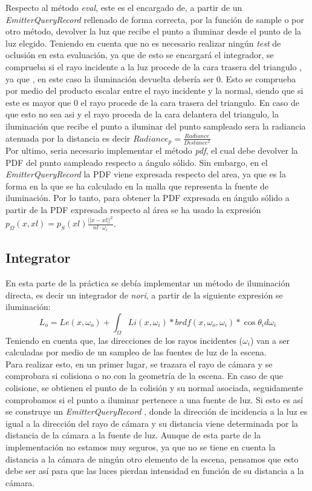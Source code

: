 \documentclass[10pt,oneside,a4paper]{article}
\begin{document}
Respecto al método \textit{eval}, este es el encargado de, a partir de un \textit{EmitterQueryRecord} rellenado de forma correcta, por la función de sample o por otro método, devolver la luz que recibe el punto a iluminar desde el punto de la luz elegido. Teniendo en cuenta que no es necesario realizar ningún \textit{test} de oclusión en esta evaluación, ya que de esto se encargará el integrador, se comprueba si el rayo incidente a la luz procede de la cara trasera del triangulo , ya que , en este caso la iluminación devuelta debería ser 0. Esto se comprueba por medio del producto escalar entre el rayo incidente y la normal, siendo que si este es mayor que 0 el rayo procede de la cara trasera del triangulo. En caso de que esto no sea asi y el rayo proceda de la cara delantera del triangulo, la iluminación que recibe el punto a iluminar del punto sampleado sera la radiancia atenuada por la distancia es decir $Radiance_p = \frac{Radiance}{Distance^2}$\\

Por ultimo, seria necesario implementar el método \textit{pdf}, el cual debe devolver la PDF del punto sampleado respecto a ángulo sólido. Sin embargo, en el  \textit{EmitterQueryRecord} la PDF viene expresada respecto del area, ya que es la forma en la que se ha calculado en la malla que representa la fuente de iluminación. Por lo tanto, para obtener la PDF expresada en ángulo sólido a partir de la PDF expresada respecto al área se ha usado la expresión $p_\Omega(x,xl) = p_S(xl)\frac{||x-xl||^2}{nl\cdot\omega_i}$.\\

\subsection{Integrator}
En esta parte de la práctica se debía implementar un método de iluminación directa, es decir un integrador de \textit{nori}, a partir de la siguiente expresión se iluminación:
$$L_o = Le(x,\omega_o) + \int_\Omega Li(x,\omega_i) * brdf(x,\omega_o,\omega_i)  * \cos\theta_i d\omega_i$$
Teniendo en cuenta que, las direcciones de los rayos incidentes ($\omega_i$) van a ser calculadas por medio de un sampleo de las fuentes de luz de la escena.\\

Para realizar esto, en un primer lugar, se trazara el rayo de cámara y se comprobara si colisiona o no con la geometría de la escena. En caso de que colisione, se obtienen el punto de la colisión y su normal asociada, seguidamente comprobamos si el punto a iluminar pertenece a una fuente de luz. Si esto es así se construye un \textit{EmitterQueryRecord} , donde la dirección de incidencia a la luz es igual a la dirección del rayo de cámara y su distancia viene determinada por la distancia de la cámara a la fuente de luz. Aunque de esta parte de la implementación no estamos muy seguros, ya que no se tiene en cuenta la distancia a la cámara de ningún otro elemento de la escena, pensamos que esto debe ser así para que las luces pierdan intensidad en función de su distancia a la cámara.\\
\end{document}
